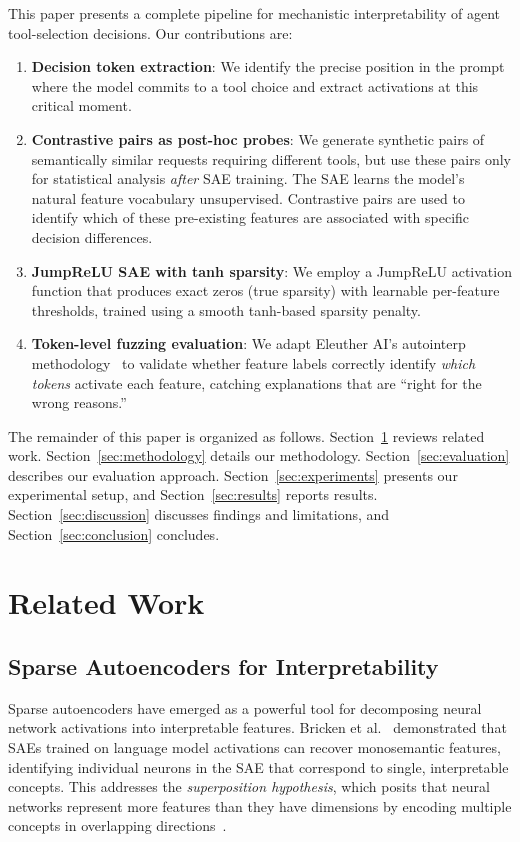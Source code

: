 \documentclass[runningheads]{llncs}
\begin{document}
This paper presents a complete pipeline for mechanistic interpretability of agent tool-selection decisions. Our contributions are:

\begin{enumerate}
\item \textbf{Decision token extraction}: We identify the precise position in the prompt where the model commits to a tool choice and extract activations at this critical moment.
\item \textbf{Contrastive pairs as post-hoc probes}: We generate synthetic pairs of semantically similar requests requiring different tools, but use these pairs only for statistical analysis \emph{after} SAE training. The SAE learns the model's natural feature vocabulary unsupervised. Contrastive pairs are used to identify which of these pre-existing features are associated with specific decision differences.
\item \textbf{JumpReLU SAE with tanh sparsity}: We employ a JumpReLU activation function that produces exact zeros (true sparsity) with learnable per-feature thresholds, trained using a smooth tanh-based sparsity penalty.
\item \textbf{Token-level fuzzing evaluation}: We adapt Eleuther AI's autointerp methodology~\cite{ref_juang2024} to validate whether feature labels correctly identify \emph{which tokens} activate each feature, catching explanations that are ``right for the wrong reasons.''
\end{enumerate}

The remainder of this paper is organized as follows. Section~\ref{sec:related} reviews related work. Section~\ref{sec:methodology} details our methodology. Section~\ref{sec:evaluation} describes our evaluation approach. Section~\ref{sec:experiments} presents our experimental setup, and Section~\ref{sec:results} reports results. Section~\ref{sec:discussion} discusses findings and limitations, and Section~\ref{sec:conclusion} concludes.


\section{Related Work}
\label{sec:related}

\subsection{Sparse Autoencoders for Interpretability}

Sparse autoencoders have emerged as a powerful tool for decomposing neural network activations into interpretable features. Bricken et al.~\cite{ref_bricken2023} demonstrated that SAEs trained on language model activations can recover monosemantic features, identifying individual neurons in the SAE that correspond to single, interpretable concepts. This addresses the \emph{superposition hypothesis}, which posits that neural networks represent more features than they have dimensions by encoding multiple concepts in overlapping directions~\cite{elhage2022toymodelssuperposition}.
\end{document}
